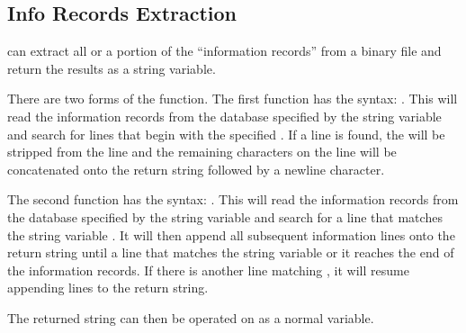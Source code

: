\subsection{\exo{} Info Records Extraction} \aprepro{} can extract all
or a portion of the ``information records'' from a binary \exo{} file
and return the results as a string variable. 

There are two forms of the function.  The first function has the
syntax:  .  This will read
the information records from the \exo{} database specified by the
string variable  and search for lines
that begin with the specified .  If a line is found, the
 will be stripped from the line and the remaining
characters on the line will be concatenated onto the return string
followed by a newline character.

The second function has the syntax: .
This will read the information records from the \exo{} database
specified by the string variable  and search for a line
that matches the string variable .  It will then append all
subsequent information lines onto the return string until a line that
matches the string variable  or it reaches the end of the
information records.  If there is another line matching ,
it will resume appending lines to the return string.

The returned string can then be operated on as a normal \aprepro{}
variable.

